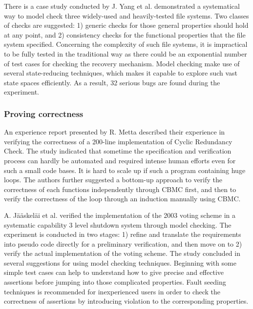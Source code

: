 There is a case study conducted by J. Yang et al. \cite{Yang:2006:UMC:1189256.1189259} demonstrated a systematical way to model check three widely-used and heavily-tested file systems. Two classes of checks are suggested: 1) generic checks for those general properties should hold at any point, and 2) consistency checks for the functional properties that the file system specified. Concerning the complexity of such file systems, it is impractical to be fully tested in the traditional way as there could be an exponential number of test cases for checking the recovery mechanism. Model checking make use of several state-reducing techniques, which makes it capable to explore such vast state spaces efficiently. As a result, 32 serious bugs are found during the experiment.

\subsubsection{Proving correctness}
An experience report presented by R. Metta \cite{Metta:2011:VCO:2004685.2005455} described their experience in verifying the correctness of a 200-line implementation of Cyclic Redundancy Check. The study indicated that sometime the specification and verification process can hardly be automated and required intense human efforts even for such a small code bases. It is hard to scale up if such a program containing huge loops. The authors further suggested a bottom-up approach to verify the correctness of each functions independently through CBMC first, and then to verify the correctness of the loop through an induction manually using CBMC. 

A. J{\"a}{\"a}skel{\"a}i et al. \cite{jskelinen_et_al:OASIcs:2012:3589} verified the implementation of the 2003 voting scheme in a systematic capability 3 level shutdown system through model checking. The experiment is conducted in two stages: 1) refine and translate the requirements into pseudo code directly for a preliminary verification, and then move on to 2) verify the actual implementation of the voting scheme. The study concluded in several suggestions for using model checking techniques. Beginning with some simple test cases can help to understand how to give precise and effective assertions before jumping into those complicated properties. Fault seeding techniques is recommended for inexperienced users in order to check the correctness of assertions by introducing violation to the corresponding properties. 

